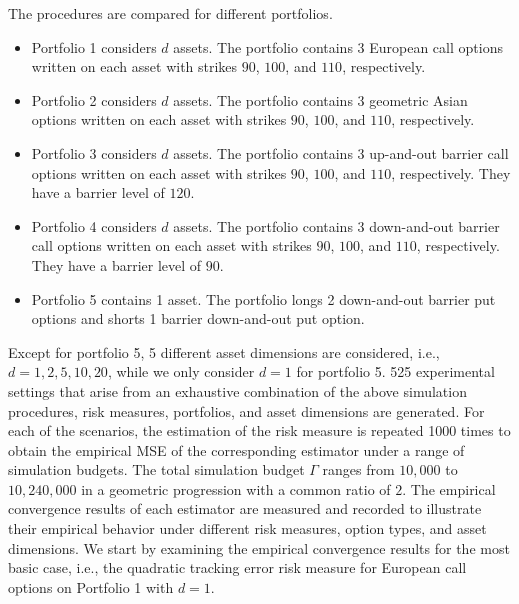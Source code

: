 The procedures are compared for different portfolios.
\begin{itemize}
    \item   Portfolio 1 considers $d$ assets.
    The portfolio contains 3 European call options written on each asset with strikes $90$, $100$, and $110$, respectively. 
    \item   Portfolio 2 considers $d$ assets.
    The portfolio contains 3 geometric Asian options written on each asset with strikes $90$, $100$, and $110$, respectively. 
    \item   Portfolio 3 considers $d$ assets.
    The portfolio contains 3 up-and-out barrier call options written on each asset with strikes $90$, $100$, and $110$, respectively. They have a barrier level of $120$.
    \item   Portfolio 4 considers $d$ assets.
    The portfolio contains 3 down-and-out barrier call options written on each asset with strikes $90$, $100$, and $110$, respectively. They have a barrier level of $90$.
    \item   Portfolio 5 contains 1 asset.
    The portfolio longs 2 down-and-out barrier put options and shorts 1 barrier down-and-out put option. 
\end{itemize}
Except for portfolio 5, 5 different asset dimensions are considered, i.e., $d = 1, 2, 5, 10, 20$, while we only consider $d=1$ for portfolio 5. 
525 experimental settings that arise from an exhaustive combination of the above simulation procedures, risk measures, portfolios, and asset dimensions are generated.
For each of the scenarios, the estimation of the risk measure is repeated 1000 times to obtain the empirical MSE of the corresponding estimator under a range of simulation budgets.
The total simulation budget $\Gamma$ ranges from $10,000$ to $10,240,000$ in a geometric progression with a common ratio of $2$.
The empirical convergence results of each estimator are measured and recorded to illustrate their empirical behavior under different risk measures, option types, and asset dimensions.
We start by examining the empirical convergence results for the most basic case, i.e., the quadratic tracking error risk measure for European call options on Portfolio 1 with $d = 1$.

